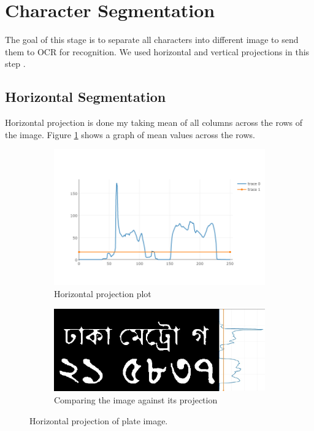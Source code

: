 \documentclass{standalone}
\begin{document}
\section{Character Segmentation}
The goal of this stage is to separate all characters into different image to send them to OCR for recognition. We used horizontal and vertical projections in this step \cite{joarder2012bangla}.


\subsection{Horizontal Segmentation}
Horizontal projection is done my taking mean of all columns across the rows of the image. Figure \ref{fig:HorizontalProjection} shows a graph of mean values across the rows.
\begin{figure}
\centering
\begin{subfigure}{0.9\textwidth}
  \centering
  \includegraphics[width=0.8\linewidth]{./img/plots/horizontal-1}
  \caption{Horizontal projection plot}
\end{subfigure}
\begin{subfigure}{0.8\textwidth}
  \centering
  \includegraphics[width=0.8\linewidth]{./img/plots/horizontal-2}
  \caption{Comparing the image against its projection}
\end{subfigure}
\caption{Horizontal projection of plate image.}
\label{fig:HorizontalProjection}
\end{figure}
\end{document}
